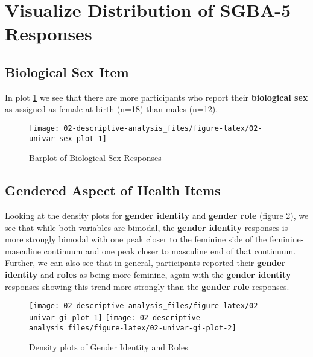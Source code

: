 \documentclass[
]{book}
\begin{document}
\section{Visualize Distribution of SGBA-5 Responses}\label{visualize-distribution-of-sgba-5-responses}

\subsection{Biological Sex Item}\label{biological-sex-item}

In plot \ref{fig:02-univar-sex-plot} we see that there are more participants who report their \textbf{biological sex} as assigned as female at birth (n=18) than males (n=12).

\begin{figure}

{\centering \texttt{[image: 02-descriptive-analysis\_files/figure-latex/02-univar-sex-plot-1]} 

}

\caption{Barplot of Biological Sex Responses}\label{fig:02-univar-sex-plot}
\end{figure}

\subsection{Gendered Aspect of Health Items}\label{gendered-aspect-of-health-items}

Looking at the density plots for \textbf{gender identity} and \textbf{gender role} (figure \ref{fig:02-univar-gi-plot}), we see that while both variables are bimodal, the \textbf{gender identity} responses is more strongly bimodal with one peak closer to the feminine side of the feminine-masculine continuum and one peak closer to masculine end of that continuum. Further, we can also see that in general, participants reported their \textbf{gender identity} and \textbf{roles} as being more feminine, again with the \textbf{gender identity} responses showing this trend more strongly than the \textbf{gender role} responses.

\begin{figure}

{\centering \texttt{[image: 02-descriptive-analysis\_files/figure-latex/02-univar-gi-plot-1]} \texttt{[image: 02-descriptive-analysis\_files/figure-latex/02-univar-gi-plot-2]} 

}

\caption{Density plots of Gender Identity and Roles}\label{fig:02-univar-gi-plot}
\end{figure}
\end{document}

